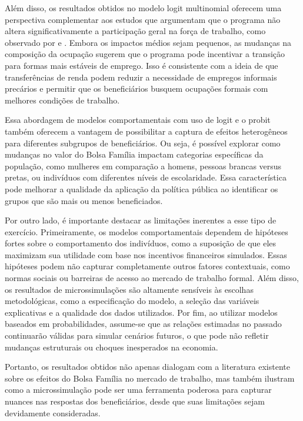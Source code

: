 \documentclass[12pt, a4paper, openany]{book}
\numberwithin{equation}{chapter}
\numberwithin{table}{chapter}
\numberwithin{figure}{chapter}
\theoremstyle{break}
\begin{document}
Além disso, os resultados obtidos no modelo logit multinomial oferecem uma perspectiva complementar aos estudos que argumentam que o programa não altera significativamente a participação geral na força de trabalho, como observado por \textcite{debrauw2015bolsa} e \textcite{oliveira2012se}. Embora os impactos médios sejam pequenos, as mudanças na composição da ocupação sugerem que o programa pode incentivar a transição para formas mais estáveis de emprego. Isso é consistente com a ideia de que transferências de renda podem reduzir a necessidade de empregos informais precários e permitir que os beneficiários busquem ocupações formais com melhores condições de trabalho.

Essa abordagem de modelos comportamentais com uso de logit e o probit também oferecem a vantagem de possibilitar a captura de efeitos heterogêneos para diferentes subgrupos de beneficiários. Ou seja, é possível explorar como mudanças no valor do Bolsa Família impactam categorias específicas da população, como mulheres em comparação a homens, pessoas brancas versus pretas, ou indivíduos com diferentes níveis de escolaridade. Essa característica pode melhorar a qualidade da aplicação da política pública ao identificar os grupos que são mais ou menos beneficiados. 

Por outro lado, é importante destacar as limitações inerentes a esse tipo de exercício. Primeiramente, os modelos comportamentais dependem de hipóteses fortes sobre o comportamento dos indivíduos, como a suposição de que eles maximizam sua utilidade com base nos incentivos financeiros simulados. Essas hipóteses podem não capturar completamente outros fatores contextuais, como normas sociais ou barreiras de acesso ao mercado de trabalho formal. Além disso, os resultados de microssimulações são altamente sensíveis às escolhas metodológicas, como a especificação do modelo, a seleção das variáveis explicativas e a qualidade dos dados utilizados. Por fim, ao utilizar modelos baseados em probabilidades, assume-se que as relações estimadas no passado continuarão válidas para simular cenários futuros, o que pode não refletir mudanças estruturais ou choques inesperados na economia.

Portanto, os resultados obtidos não apenas dialogam com a literatura existente sobre os efeitos do Bolsa Família no mercado de trabalho, mas também ilustram como a microssimulação pode ser uma ferramenta poderosa para capturar nuances nas respostas dos beneficiários, desde que suas limitações sejam devidamente consideradas.
\end{document}
